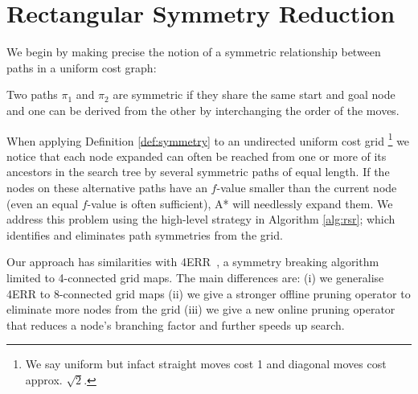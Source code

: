 \section{Rectangular Symmetry Reduction}
\label{sec:rsr}


We begin by making precise the notion of a symmetric relationship between paths
in a uniform cost graph:
\begin{definition}
\label{def:symmetry}
Two paths $\pi_{1}$ and $\pi_{2}$ are symmetric if they share the same start and
goal node and one can be derived from the other by interchanging the order of the
moves.
\end{definition}

When applying Definition \ref{def:symmetry} to an undirected uniform cost grid 
\footnote{We say uniform but infact straight moves cost 1 and diagonal
moves cost approx. $\sqrt{2}$.} we notice that each node expanded can
often be reached from one or more of its ancestors in the search tree by several 
symmetric paths of equal length.
If the nodes on these alternative paths have an $f$-value smaller than the
current node (even an equal $f$-value is often sufficient), A* will needlessly
expand them.  
We address this problem using the high-level strategy in Algorithm
\ref{alg:rsr}; which identifies and eliminates path symmetries from the grid.



Our approach has similarities with 4ERR~\cite{harabor10}, a symmetry breaking algorithm 
limited to 4-connected grid maps.
The main differences are: (i) we generalise 4ERR to 8-connected grid maps 
(ii) we give a stronger offline pruning operator to eliminate more nodes from
the grid (iii) we give a new online pruning operator that reduces a node's branching
factor and further speeds up search.

